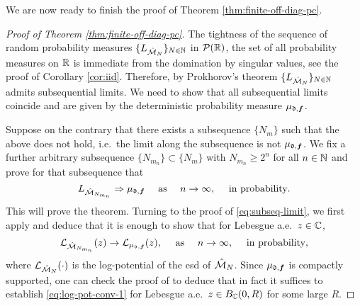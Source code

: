 \documentclass{amsart}
\numberwithin{equation}{section}
\def\corOZ{}
\newcommand{\abbr}[1]{{\sc\lowercase{#1}}}
\begin{document}




We are now ready to finish the proof of Theorem \ref{thm:finite-off-diag-pc}.

\begin{proof}[Proof of Theorem \ref{thm:finite-off-diag-pc}]
The tightness of
the sequence of random probability measures
$\{L_{\hat{\mathcal{M}}_N}\}_{N \in \mathbb N}$ in $\mathcal{P}(\mathbb{R})$,
the set of all probability measures on $\mathbb{R}$ is immediate from the domination
by singular values, see the proof of Corollary \ref{cor:iid}.
Therefore, by Prokhorov's theorem $\{L_{\hat{\mathcal{M}}_N}\}_{N \in \mathbb N}$
admits subsequential limits. We need to show that all subsequential limits coincide
and are given by the deterministic probability measure $\mu_{\mathfrak{d},{\bm f}}$.

Suppose on the contrary that there exists a subsequence $\{N_m\}$ such that the above does not hold, i.e.~the
limit along the subsequence is not $\mu_{\mathfrak{d},{\bm f}}$.
We \corOZ{fix a further arbitrary subsequence $\{N_{m_n}\} \subset \{N_m\}$ with
$N_{m_n} \ge 2^n$ for all $n \in \mathbb N$ and prove for that subsequence that}
\begin{equation}\label{eq:subseq-limit}
L_{\hat{\mathcal{M}}_{N_{m_n}}} \Rightarrow \mu_{\mathfrak{d}, {\bm f}} \quad \text{ as } \quad n \to \infty, \quad \text{ in probability}.
\end{equation}
This will prove the theorem.
Turning to \corOZ{the proof of
\eqref{eq:subseq-limit}, we first apply  \cite[Theorem 2.8.3]{tao2012topics}
and deduce that}
it is enough to show that for Lebesgue a.e.~$z \in \mathbb{C}$,
\begin{equation}\label{eq:log-pot-conv-1}
\mathcal{L}_{\hat{\mathcal{M}}_{N_{m_n}}}(z) \to \mathcal{L}_{\mu_{\mathfrak{d},{\bm f}}}(z), \quad \text{ as } \quad n \to \infty, \quad \text{ in probability},
\end{equation}
where $\mathcal{L}_{\hat{\mathcal{M}}_N}(\cdot)$ is the log-potential of the \abbr{ESD} of $\hat{\mathcal{M}}_N$. Since $\mu_{\mathfrak{d},{\bm f}}$ is compactly supported,
one can check the proof of \cite[Theorem 2.8.3]{tao2012topics} to deduce that
\corOZ{in fact} it suffices to establish \eqref{eq:log-pot-conv-1} for Lebesgue a.e.~$z \in B_{\mathbb{C}}(0,R)$ for some large $R$.


\end{proof}
\end{document}
